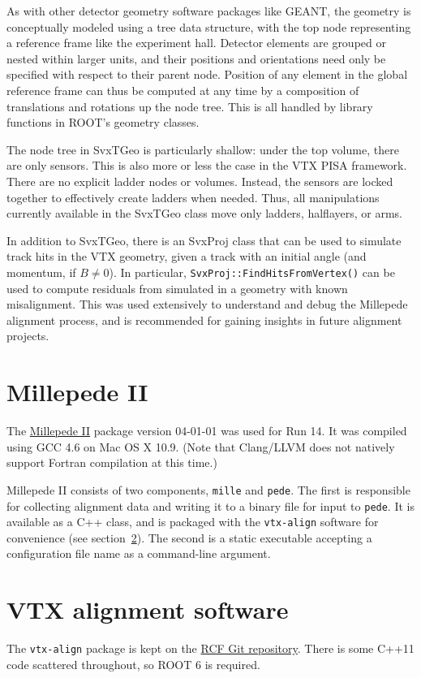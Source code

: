 \documentclass[12pt]{article}
\begin{document}
As with other detector geometry software packages like GEANT, the geometry is conceptually modeled using a tree data structure, with the top node representing a reference frame like the experiment hall. Detector elements are grouped or nested within larger units, and their positions and orientations need only be specified with respect to their parent node. Position of any element in the global reference frame can thus be computed at any time by a composition of translations and rotations up the node tree. This is all handled by library functions in ROOT's geometry classes.

The node tree in SvxTGeo is particularly shallow: under the top volume, there are only sensors. This is also more or less the case in the VTX PISA framework.
There are no explicit ladder nodes or volumes. Instead, the sensors are locked together to effectively create ladders when needed. Thus, all manipulations currently available in the SvxTGeo class move only ladders, halflayers, or arms.

In addition to SvxTGeo, there is an SvxProj class that can be used to simulate track hits in the VTX geometry, given a track with an initial angle (and momentum, if $B \neq 0$). In particular, \texttt{SvxProj::FindHitsFromVertex()} can be used to compute residuals from simulated in a geometry with known misalignment. This was used extensively to understand and debug the Millepede alignment process, and is recommended for gaining insights in future alignment projects.

\section{Millepede II}
The \href{http://www.desy.de/~kleinwrt/MP2/doc/html/index.html}{Millepede II} package version 04-01-01 was used for Run 14. It was compiled using GCC 4.6 on Mac OS X 10.9. (Note that Clang/LLVM does not natively support Fortran compilation at this time.)

Millepede II consists of two components, \texttt{mille} and \texttt{pede}. The first is responsible for collecting alignment data and writing it to a binary file for input to \texttt{pede}. It is available as a C++ class, and is packaged with the \texttt{vtx-align} software for convenience (see section~\ref{sec:vtxalign}). The second is a static executable accepting a configuration file name as a command-line argument.

\section{VTX alignment software} \label{sec:vtxalign}
The \texttt{vtx-align} package is kept on the \href{https://git.racf.bnl.gov/phenix/cgit/vtx-align/vtx-align.git}{RCF Git repository}. There is some C++11 code scattered throughout, so ROOT 6 is required. 
\end{document}

